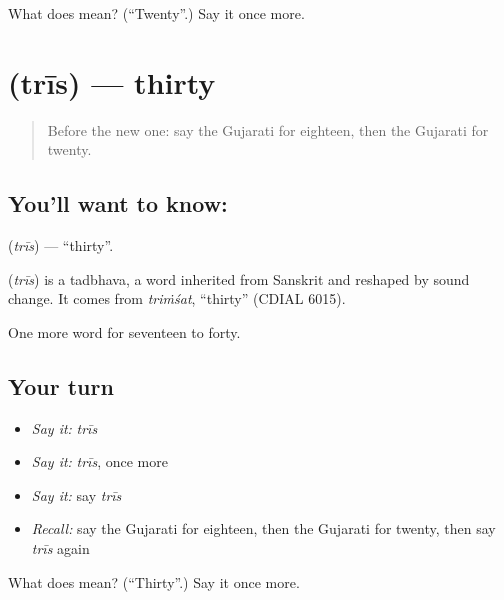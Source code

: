 \begin{tcolorbox}[breakable,colback=teal!4,colframe=teal!35!black,title={Before you move on}]
What does  mean? (\textquotedblleft{}Twenty\textquotedblright{}.) Say it once more.
\end{tcolorbox}
\section[\texorpdfstring{\gu{ત્રીસ} (trīs)}{ત્રીસ (trīs)}]{ (trīs) — thirty}

\label{lesson:GU-C82-thirty}



\begin{quote}
Before the new one: say the Gujarati for eighteen, then the Gujarati for twenty.
\end{quote}

\subsection*{You'll want to know: }
\textbf{} (\emph{trīs}) — \textquotedblleft{}thirty\textquotedblright{}.

\begin{cousinweb}
\textbf{} (\emph{trīs}) is a tadbhava, a word inherited from Sanskrit and reshaped by sound change. It comes from \emph{triṁśat}, \textquotedblleft{}thirty\textquotedblright{} (CDIAL 6015).
\end{cousinweb}

\begin{grammarlens}[title={What you've built}]
One more word for seventeen to forty.
\end{grammarlens}

\subsection*{Your turn}
\begin{itemize}
\raggedright
  \item \emph{Say it:} \emph{trīs}
  \item \emph{Say it:} \emph{trīs}, once more
  \item \emph{Say it:} say \emph{trīs}
  \item \emph{Recall:} say the Gujarati for eighteen, then the Gujarati for twenty, then say \emph{trīs} again
\end{itemize}

\begin{tcolorbox}[breakable,colback=teal!4,colframe=teal!35!black,title={Before you move on}]
What does  mean? (\textquotedblleft{}Thirty\textquotedblright{}.) Say it once more.
\end{tcolorbox}
